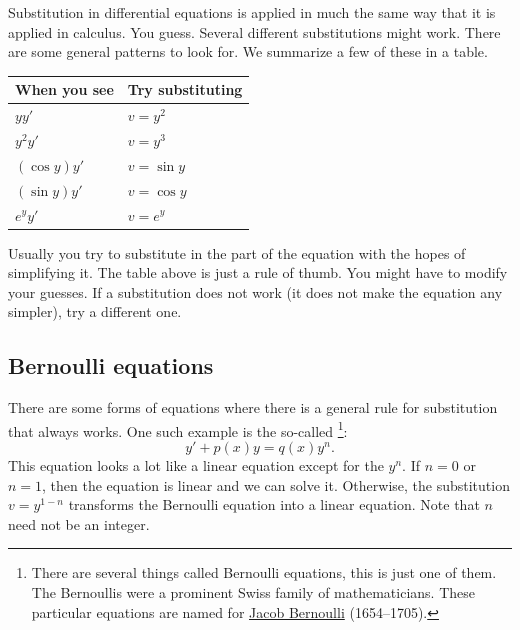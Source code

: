 \medskip

Substitution in differential equations is applied in much the same way that
it is applied in calculus.  You guess.  Several different substitutions might
work.  There are some general patterns to look for.  We summarize a few
of these in a table.

\begin{center}
\begin{tabular}{@{}ll@{}}
\toprule
When you see & Try substituting \\
\midrule
$yy'$ & $v=y^2$ \\
$y^2y'$ & $v=y^3$ \\
$(\cos y)y'$ & $v=\sin y$ \\
$(\sin y)y'$ & $v=\cos y$ \\
$e^y y'$ & $v=e^y$ \\ \bottomrule
\end{tabular}
\end{center}

Usually you try to substitute in the  part of the
equation with the hopes of simplifying it.  The table above is just a rule
of thumb.  You might have to modify your guesses.  If a substitution
does not work (it does not make the equation any simpler), try a different one.

\subsection{Bernoulli equations}

There are some forms of equations where there is a
general rule for substitution that always works.
One such example is the so-called
\emph{}%
\footnote{There are several things called Bernoulli equations, this is just one
of them.  The Bernoullis were a prominent Swiss family of mathematicians.  These
particular equations are named for
\href{https://en.wikipedia.org/wiki/Jacob_Bernoulli}{Jacob Bernoulli} (1654--1705).}:
\begin{equation*}
y' + p(x)y = q(x)y^n .
\end{equation*}
This equation
looks a lot like a linear equation except for the $y^n$.  If $n=0$ or
$n=1$, then the equation is linear and we can solve it.  Otherwise,
the substitution $v=y^{1-n}$ transforms the 
Bernoulli equation into a linear equation.  Note that $n$
need not be an integer.

